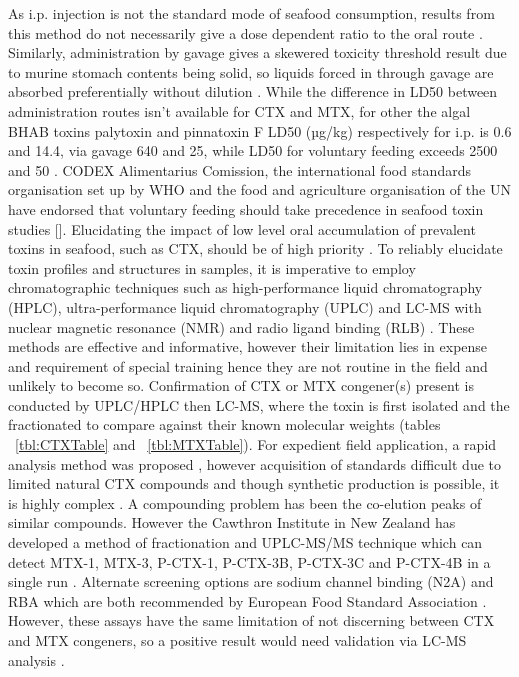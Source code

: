 \documentclass[12pt]{article}
\begin{document}
As i.p. injection is not the standard mode of seafood consumption, results from this method do not necessarily give a dose dependent ratio to the oral route \cite{botana2014seafood}. Similarly, administration by gavage gives a skewered toxicity threshold result due to murine stomach contents being solid, so liquids forced in through gavage are absorbed preferentially without dilution \cite{mundyICHA}. While the difference in LD50 between administration routes isn’t available for CTX and MTX, for other the algal BHAB toxins palytoxin and pinnatoxin F LD50 (µg/kg) respectively for i.p. is 0.6 and 14.4, via gavage 640 and 25, while LD50 for voluntary feeding exceeds 2500 and 50 \cite{botana2014seafood}. CODEX Alimentarius Comission, the international food standards organisation set up by WHO and the food and agriculture organisation of the UN have endorsed that voluntary feeding should take precedence in seafood toxin studies []. %
 Elucidating the impact of low level oral accumulation of prevalent toxins in seafood, such as CTX, should be of high priority \cite{mundyICHA}.
To reliably elucidate toxin profiles and structures in samples, it is imperative to employ chromatographic techniques such as high-performance liquid chromatography (HPLC), ultra-performance liquid chromatography (UPLC) and LC-MS with nuclear magnetic resonance (NMR) \cite{legrand1989isolation,murata1990structures,murata1990structures,satake1996isolation,diogened2014chemistry} and radio ligand binding (RLB) \cite{hamilton2002multiple,hamilton2002isolation}. These methods are effective and informative, however their limitation lies in expense and requirement of special training hence they are not routine in the field and unlikely to become so. %
Confirmation of CTX or MTX congener(s) present is conducted by UPLC/HPLC then LC-MS, where the toxin is first isolated and the fractionated to compare against their known molecular weights (tables ~\ref{tbl:CTXTable} and ~\ref{tbl:MTXTable}). For expedient field application, a rapid analysis method was proposed \cite{lewis2009rapid}, however acquisition of standards difficult due to limited natural CTX compounds \cite{berdalet2012global} and though synthetic production is possible, it is highly complex \cite{hirama2001total}. A compounding problem has been the co-elution peaks of similar compounds. However the Cawthron Institute in New Zealand has developed a method of fractionation and UPLC-MS/MS technique which can detect MTX-1, MTX-3, P-CTX-1, P-CTX-3B, P-CTX-3C and P-CTX-4B in a single run \cite{selwoodICHA}.
Alternate screening options are sodium channel binding (N2A) \cite{dickey2010ciguatera} and RBA \cite{poli1997identification,darius2007ciguatera} which are both recommended by European Food Standard Association \cite{}. %
However, these assays have the same limitation of not discerning between CTX and MTX congeners, so a positive result would need validation via LC-MS analysis \cite{diogened2014chemistry,mak2013pacific}. 
\end{document}
